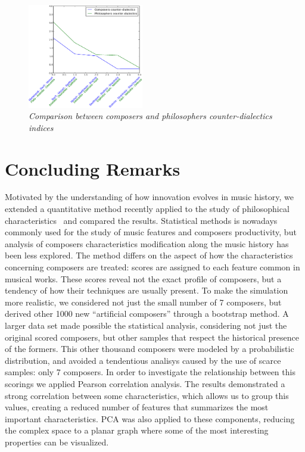 \documentclass[
 aip,
 jmp,
 amsmath,amssymb,
 reprint,
]{revtex4-1}
\begin{document}
\begin{figure}[ht]
        \begin{center}
                \includegraphics[width=0.45\textwidth]{compara_dialeticas2}
        \end{center}
        \caption{\it Comparison between composers and philosophers
          counter-dialectics indices}
        \label{fig:comparingdialectics}
\end{figure}



\section{Concluding Remarks}

Motivated by the understanding of how innovation evolves in music
history, we extended a quantitative method
recently applied to the study of philosophical
characteristics~\cite{Fabbri} and compared the results. Statistical
methods is nowadays commonly used for the study of music features and
composers productivity, but analysis of
composers characteristics modification along the music history has been less
explored. The method differs on the
aspect of how the characteristics concerning composers are treated:
scores are assigned to each feature common in musical
works. These scores reveal not the
exact profile of composers, but a tendency of how their
techniques are usually present. To make the simulation more
realistic, we considered not just the small number of 7 composers, but
derived other 1000 new ``artificial composers'' through a bootstrap
method. A larger data set made possible the statistical analysis,
considering not just the original scored composers, but other samples
that respect the historical presence of the formers. This other thousand
composers were modeled by a
probabilistic distribution, and avoided a tendentious analisys caused by
the use of scarce samples: only 7 composers.
In order to investigate the
relationship between this scorings we applied Pearson correlation
analysis. The results demonstrated a strong correlation between some
characteristics, which allows us to group this values, creating a
reduced number of features that summarizes the most important
characteristics. PCA was also applied to these components, reducing
the complex space to a planar graph where some of the most interesting
properties can be visualized. 
\end{document}
